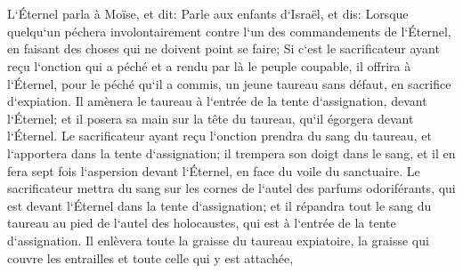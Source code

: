 \chapter{}

\verse L`Éternel parla à Moïse, et dit: 
\verse Parle aux enfants d`Israël, et dis: Lorsque quelqu`un péchera involontairement contre l`un des commandements de l`Éternel, en faisant des choses qui ne doivent point se faire; 
\verse Si c`est le sacrificateur ayant reçu l`onction qui a péché et a rendu par là le peuple coupable, il offrira à l`Éternel, pour le péché qu`il a commis, un jeune taureau sans défaut, en sacrifice d`expiation. 
\verse Il amènera le taureau à l`entrée de la tente d`assignation, devant l`Éternel; et il posera sa main sur la tête du taureau, qu`il égorgera devant l`Éternel. 
\verse Le sacrificateur ayant reçu l`onction prendra du sang du taureau, et l`apportera dans la tente d`assignation; 
\verse il trempera son doigt dans le sang, et il en fera sept fois l`aspersion devant l`Éternel, en face du voile du sanctuaire. 
\verse Le sacrificateur mettra du sang sur les cornes de l`autel des parfums odoriférants, qui est devant l`Éternel dans la tente d`assignation; et il répandra tout le sang du taureau au pied de l`autel des holocaustes, qui est à l`entrée de la tente d`assignation. 
\verse Il enlèvera toute la graisse du taureau expiatoire, la graisse qui couvre les entrailles et toute celle qui y est attachée, 
